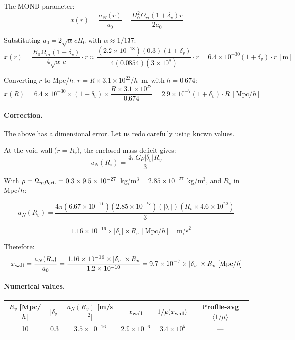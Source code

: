 \documentclass[11pt,a4paper]{article}
\newcommand{\ee}[1]{\times 10^{#1}}
\begin{document}
The MOND parameter:
\begin{equation}
x(r) = \frac{a_N(r)}{a_0}
= \frac{H_0^2 \Omega_m (1+\delta_v) r}{2 a_0}
\end{equation}

Substituting $a_0 = 2\sqrt{\alpha}\,cH_0$ with $\alpha \approx 1/137$:
\begin{equation}
x(r) = \frac{H_0 \Omega_m (1+\delta_v)}{4\sqrt{\alpha}\,c} \cdot r
\approx \frac{(2.2\ee{-18})(0.3)(1+\delta_v)}{4(0.0854)(3\ee{8})} \cdot r
= 6.4\ee{-30} (1+\delta_v) \cdot r~[\text{m}]
\end{equation}

Converting $r$ to Mpc/$h$: $r = R \times 3.1\ee{22}/h$~m, with $h = 0.674$:
\begin{equation}
x(R) = 6.4\ee{-30} \times (1+\delta_v) \times \frac{R \times 3.1\ee{22}}{0.674}
= 2.9\ee{-7} (1+\delta_v) \cdot R~[\text{Mpc}/h]
\end{equation}

\paragraph{Correction.} The above has a dimensional error.  Let us redo
carefully using known values.

At the void wall ($r = R_v$), the enclosed mass deficit gives:
\begin{equation}
a_N(R_v) = \frac{4\pi G \bar{\rho} |\delta_v| R_v}{3}
\end{equation}

With $\bar{\rho} = \Omega_m \rho_{\rm crit} = 0.3 \times 9.5\ee{-27}$~kg/m$^3
= 2.85\ee{-27}$~kg/m$^3$, and $R_v$ in Mpc/$h$:

\begin{equation}
a_N(R_v) = \frac{4\pi (6.67\ee{-11})(2.85\ee{-27})(|\delta_v|)
(R_v \times 4.6\ee{22})}{3}
\end{equation}

\begin{equation}
= 1.16\ee{-16} \times |\delta_v| \times R_v~[\text{Mpc}/h]
\quad \text{m/s}^2
\end{equation}

Therefore:
\begin{equation}
x_{\rm wall} = \frac{a_N(R_v)}{a_0}
= \frac{1.16\ee{-16} \times |\delta_v| \times R_v}{1.2\ee{-10}}
= 9.7\ee{-7} \times |\delta_v| \times R_v~[\text{Mpc}/h]
\end{equation}

\paragraph{Numerical values.}
\begin{center}
\begin{tabular}{cccccc}
\toprule
$R_v$ [Mpc/$h$] & $|\delta_v|$ & $a_N(R_v)$ [m/s$^2$] & $x_{\rm wall}$ &
$1/\mu(x_{\rm wall})$ & Profile-avg $\langle 1/\mu \rangle$ \\
\midrule
10 & 0.3 & $3.5\ee{-16}$ & $2.9\ee{-6}$ & $3.4\ee{5}$ & --- \\
\bottomrule
\end{tabular}
\end{center}
\end{document}
